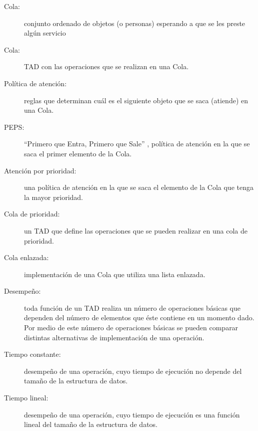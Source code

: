 \begin{description}

\item[Cola:]  conjunto ordenado de objetos (o personas) esperando a que se les
preste algún servicio

\item[Cola:]  TAD con las operaciones que se realizan en una Cola.

\item[Política de atención:]  reglas que determinan cuál es el 
siguiente objeto que se saca (atiende) en una Cola.

\item[PEPS:]  ``Primero que Entra, Primero que Sale'' , política
de atención en la que se saca el primer elemento de la Cola.

\item[Atención por prioridad:]  una política de atención en la que se saca 
el elemento de la Cola que tenga la mayor prioridad.

\item[Cola de prioridad:]  un TAD que define las operaciones que se
pueden realizar en una cola de prioridad.

\item[Cola enlazada:]  implementación de una Cola que utiliza una
lista enlazada.

\item[Desempeño:] toda función de un TAD realiza un número de operaciones
básicas que dependen del número de elementos que éste contiene en un 
momento dado. Por medio de este número de operaciones básicas se pueden 
comparar distintas alternativas de implementación de una operación.

\item[Tiempo constante:]  desempeño de una operación, cuyo tiempo de ejecución 
no depende del tamaño de la estructura de datos.

\item[Tiempo lineal:] desempeño de una operación, cuyo tiempo de ejecución 
es una función lineal del tamaño de la estructura de datos.

\end{description}
